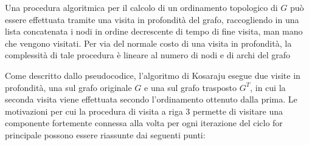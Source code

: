 Una procedura algoritmica per il calcolo di un ordinamento topologico di $G$ pu\`o essere effettuata tramite una
visita in profondit\`a del grafo, raccogliendo in una lista concatenata i nodi in ordine decrescente di tempo
di fine visita, man mano che vengono visitati.
Per via del normale costo di una visita in profondit\`a, la complessit\`a di tale procedura \`e lineare al
numero di nodi e di archi del grafo \newline



Come descritto dallo pseudocodice, l'algoritmo di Kosaraju esegue due visite in profondit\`a, una sul grafo
originale $G$ e una sul grafo trasposto $G^T$, in cui la seconda visita viene effettuata secondo l'ordinamento
ottenuto dalla prima.
Le motivazioni per cui la procedura di visita a riga 3 permette di visitare una componente fortemente
connessa alla volta per ogni iterazione del ciclo for principale possono essere riassunte dai seguenti punti:

